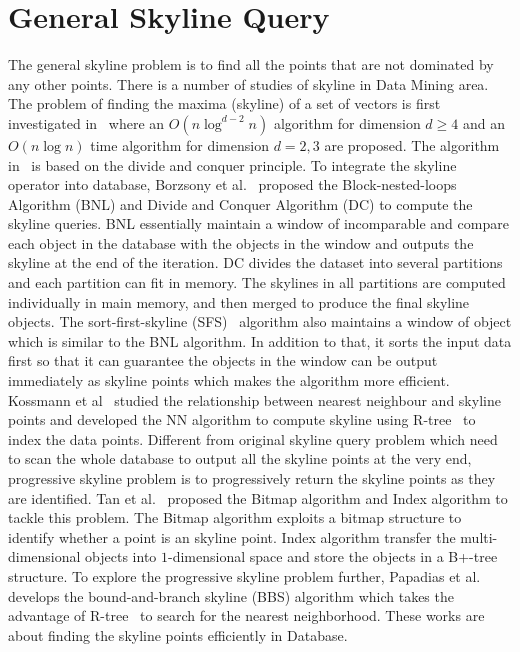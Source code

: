 \section{General Skyline Query}
\label{sec:rel:general}
The general skyline problem is to find all the points that are not dominated by any other points.
There is a number of studies of skyline in Data Mining area. The problem of finding the maxima (skyline) of a set of vectors is first investigated in~\cite{kung1975finding} where an $O(n\log ^{d-2}n)$ algorithm for dimension $d\geq 4$ and an $O(n\log n)$ time algorithm for dimension $d = 2, 3$ are proposed. The algorithm in~\cite{kung1975finding} is based on the divide and conquer principle. To integrate the skyline operator into database, Borzsony et al.~\cite{borzsony2001skyline} proposed the Block-nested-loops Algorithm (BNL) and Divide and Conquer Algorithm (DC) to compute the skyline queries. BNL essentially maintain a window of incomparable and compare each object in the database with the objects in the window and outputs the skyline at the end of the iteration. DC divides the dataset into several partitions and each partition can fit in memory. The skylines in all partitions are computed individually in main memory, and then merged to produce the final skyline objects. 
The sort-first-skyline (SFS)~\cite{chomicki2003skyline} algorithm also maintains a window of object which is similar to the BNL algorithm. In addition to that, it sorts the input data first so that it can guarantee the objects in the window can be output immediately as skyline points which makes the algorithm more efficient.
Kossmann et al~\cite{kossmann2002shooting} studied the relationship between nearest neighbour and skyline points and developed the NN algorithm to compute skyline using R-tree~\cite{beckmann1990r} to index the data points.
Different from original skyline query problem which need to scan the whole database to output all the skyline points at the very end, progressive skyline problem is to progressively return the skyline points as they are identified. Tan et al.~\cite{tan2001efficient} proposed the Bitmap algorithm and Index algorithm to tackle this problem. The Bitmap algorithm exploits a bitmap structure to identify whether a point is an skyline point. Index algorithm transfer the multi-dimensional objects into $1$-dimensional space and store the objects in a B+-tree structure. To explore the progressive skyline problem further, Papadias et al.~\cite{ papadias2003optimal, papadias2005progressive} develops the bound-and-branch skyline (BBS) algorithm which takes the advantage of R-tree~\cite{beckmann1990r} to search for the nearest neighborhood. These works are about finding the skyline points efficiently in Database.

